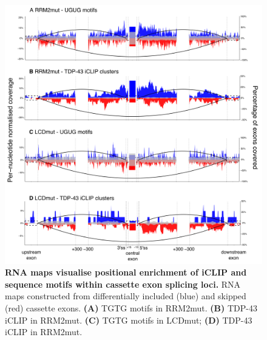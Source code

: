 \begin{figure}[h]
	\centering
	\includegraphics[width=14cm]{Figures/05_tdp_mice/RNAmap_cassettes.png}
	\caption[RNA maps visualise positional enrichment of iCLIP and sequence motifs]{
		\textbf{RNA maps visualise positional enrichment of iCLIP and sequence motifs within cassette exon splicing loci.}
	RNA maps constructed from differentially included (blue) and skipped (red) cassette exons.  
	\textbf{(A)} TGTG motifs in RRM2mut.
	\textbf{(B)} TDP-43 iCLIP in RRM2mut.
	\textbf{(C)} TGTG motifs in LCDmut; 
	\textbf{(D)} TDP-43 iCLIP in RRM2mut.
	}
	\label{fig:RNAmap_cassettes}
\end{figure}

